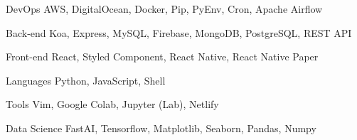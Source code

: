 

\begin{cvskills}

  \cvskill
    {DevOps} %
    {AWS, DigitalOcean, Docker, Pip, PyEnv, Cron, Apache Airflow} %

  \cvskill
    {Back-end} %
    {Koa, Express, MySQL, Firebase, MongoDB, PostgreSQL, REST API} %

  \cvskill
    {Front-end} %
    {React, Styled Component, React Native, React Native Paper} %

  \cvskill
    {Languages} %
    {Python, JavaScript, Shell} %

  \cvskill
    {Tools} %
    {Vim, Google Colab, Jupyter (Lab), Netlify} %

  \cvskill
    {Data Science} %
    {FastAI, Tensorflow, Matplotlib, Seaborn, Pandas, Numpy } %

\end{cvskills}

